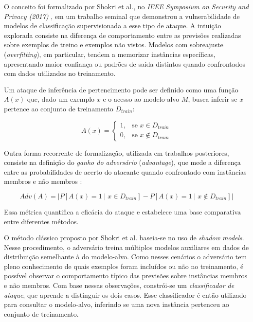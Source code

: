 \documentclass[
	12pt,				%
	openright,			%
	oneside,			%
	a4paper,			%
	english,			%
	french,				%
	spanish,			%
	brazil,				%
	]{abntex2}
\begin{document}
O conceito foi formalizado por Shokri et al., no \textit{IEEE Symposium on Security and Privacy (2017)} \cite{shokri2017mia}, em um trabalho seminal que demonstrou a vulnerabilidade de modelos de classificação supervisionada a esse tipo de ataque. A intuição explorada consiste na diferença de comportamento entre as previsões realizadas sobre exemplos de treino e exemplos não vistos. Modelos com sobreajuste (\textit{overfitting}), em particular, tendem a memorizar instâncias específicas, apresentando maior confiança ou padrões de saída distintos quando confrontados com dados utilizados no treinamento.

Um ataque de inferência de pertencimento pode ser definido como uma função $A(x)$ que, dado um exemplo $x$ e o acesso ao modelo-alvo $M$, busca inferir se $x$ pertence ao conjunto de treinamento $D_{train}$:

\begin{equation}
A(x) = 
\begin{cases}
1, & \text{se } x \in D_{train} \\
0, & \text{se } x \notin D_{train}
\end{cases}
\label{eq:mia}
\end{equation}

Outra forma recorrente de formalização, utilizada em trabalhos posteriores, consiste na definição do \textit{ganho do adversário} (\textit{advantage}), que mede a diferença entre as probabilidades de acerto do atacante quando confrontado com instâncias membros e não membros \cite{yeom2018privacyrisk}:

\begin{equation}
Adv(A) = \left| P[A(x) = 1 \mid x \in D_{train}] - P[A(x) = 1 \mid x \notin D_{train}] \right|
\label{eq:advantage}
\end{equation}

Essa métrica quantifica a eficácia do ataque e estabelece uma base comparativa entre diferentes métodos.

O método clássico proposto por Shokri et al. baseia-se no uso de \textit{shadow models}. Nesse procedimento, o adversário treina múltiplos modelos auxiliares em dados de distribuição semelhante à do modelo-alvo. Como nesses cenários o adversário tem pleno conhecimento de quais exemplos foram incluídos ou não no treinamento, é possível observar o comportamento típico das previsões sobre instâncias membros e não membros. Com base nessas observações, constrói-se um \textit{classificador de ataque}, que aprende a distinguir os dois casos. Esse classificador é então utilizado para consultar o modelo-alvo, inferindo se uma nova instância pertenceu ao conjunto de treinamento.
\end{document}
